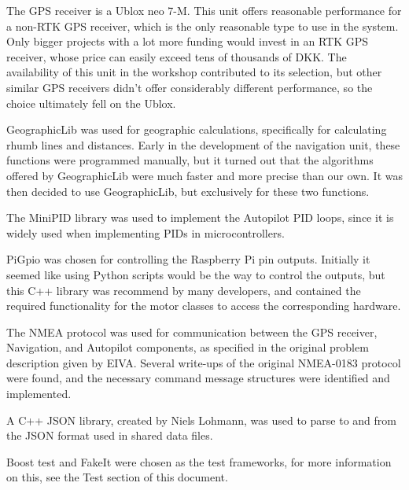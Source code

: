 The GPS receiver is a Ublox neo 7-M. This unit offers reasonable performance for a non-RTK GPS receiver, which is the only reasonable type to use in the system. Only bigger projects with a lot more funding would invest in an RTK GPS receiver, whose price can easily exceed tens of thousands of DKK. The availability of this unit in the workshop contributed to its selection, but other similar GPS receivers didn't offer considerably different performance, so the choice ultimately fell on the Ublox.

GeographicLib was used for geographic calculations, specifically for calculating rhumb lines and distances. Early in the development of the navigation unit, these functions were programmed manually, but it turned out that the algorithms offered by GeographicLib were much faster and more precise than our own. It was then decided to use GeographicLib, but exclusively for these two functions.

The MiniPID \cite{minipid} library was used to implement the Autopilot PID loops, since it is widely used when implementing PIDs in microcontrollers.

PiGpio \cite{pigpio} was chosen for controlling the Raspberry Pi pin outputs. Initially it seemed like using Python scripts would be the way to control the outputs, but this C++ library was recommend by many developers, and contained the required functionality for the motor classes to access the corresponding hardware.

The NMEA\cite{NMEA} protocol was used for communication between the GPS receiver, Navigation, and Autopilot components, as specified in the original problem description given by EIVA. Several write-ups of the original NMEA-0183 protocol were found, and the necessary command message structures were identified and implemented.

A C++ JSON library, created by Niels Lohmann\cite{json}, was used to parse to and from the JSON format used in shared data files.

Boost test and FakeIt were chosen as the test frameworks, for more information on this, see the Test section of this document.


